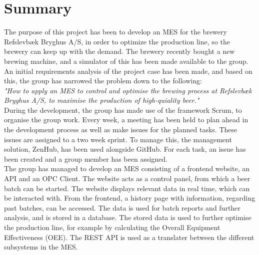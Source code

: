 \section{Summary}
The purpose of this project has been to develop an MES for the brewery
Refslevbæk Bryghus A/S, in order to optimize the production line, so the brewery
can keep up with the demand. The brewery recently bought a new brewing machine,
and a simulator of this has been made available to the group. An initial
requirements analysis of the project case has been made, and based on this, the
group has narrowed the problem down to the following:\\

\textit{"How to apply an MES to control and optimise the brewing process at
Refslevbæk Bryghus A/S, to maximise the production of high-quiality beer."}\\

During the development, the group has made use of the framework Scrum, to
organise the group work. Every week, a meeting has been held to plan ahead in
the development process as well as make issues for the planned tasks. These
issues are assigned to a two week sprint. To manage this, the management
solution, ZenHub, has been used alongside GitHub. For each task, an issue has
been created and a group member has been assigned. \\

The group has managed to develop an MES consisting of a frontend
website, an API and an OPC Client. The website acts as a control panel, from
which a beer batch can be started. The website displays relevant data in real
time, which can be interacted with. From the frontend, a history page with 
information, regarding past batches, can be accessed. The data is used for batch
reports and further analysis, and is stored in a database. The stored data is
used to further optimise the production line, for example by calculating the
Overall Equipment Effectiveness (OEE). The REST API is used as a translater
between the different subsystems in the MES.